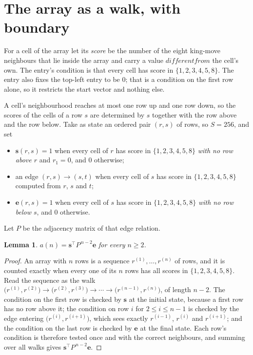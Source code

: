 \documentclass[11pt,a4paper]{article}
\theoremstyle{plain}
\newtheorem{lemma}[theorem]{Lemma}
\theoremstyle{definition}
\begin{document}
\section{The array as a walk, with boundary}

For a cell of the array let its \emph{score} be the number of the eight king-move neighbours that lie inside
the array and carry a value $different from$ the cell's own. The entry's condition is that every cell
has score in $\{1,2,3,4,5,8\}$. The entry also fixes the top-left entry to be $0$; that is a condition on the first row alone, so it restricts the start vector and nothing else.

A cell's neighbourhood reaches at most one row up and one row down, so the scores of the
cells of a row $s$ are determined by $s$ together with the row above and the row below.
Take as state an ordered pair $(r,s)$ of rows, so $S=256$, and set
\begin{itemize}
\item $\mathbf{s}(r,s)=1$ when every cell of $r$ has score in $\{1,2,3,4,5,8\}$ \emph{with no row
above $r$} and $r_1=0$, and $0$ otherwise;
\item an edge $(r,s)\to(s,t)$ when every cell of $s$ has score in $\{1,2,3,4,5,8\}$ computed from
$r$, $s$ and $t$;
\item $\mathbf{e}(r,s)=1$ when every cell of $s$ has score in $\{1,2,3,4,5,8\}$ \emph{with no row
below $s$}, and $0$ otherwise.
\end{itemize}
Let $P$ be the adjacency matrix of that edge relation.

\begin{lemma}\label{lem:walk}
$a(n)=\mathbf{s}^{\!\top}P^{\,n-2}\mathbf{e}$ for every $n\ge2$.
\end{lemma}

\begin{proof}
An array with $n$ rows is a sequence $r^{(1)},\dots,r^{(n)}$ of rows, and it is counted
exactly when every one of its $n$ rows has all scores in $\{1,2,3,4,5,8\}$. Read the sequence as the
walk $\bigl(r^{(1)},r^{(2)}\bigr)\to\bigl(r^{(2)},r^{(3)}\bigr)\to\cdots\to
\bigl(r^{(n-1)},r^{(n)}\bigr)$, of length $n-2$. The condition on the first row is
checked by $\mathbf{s}$ at the initial state, because a first row has no row above it; the
condition on row $i$ for $2\le i\le n-1$ is checked by the edge entering
$\bigl(r^{(i)},r^{(i+1)}\bigr)$, which sees exactly $r^{(i-1)}$, $r^{(i)}$ and
$r^{(i+1)}$; and the condition on the last row is checked by $\mathbf{e}$ at the final
state. Each row's condition is therefore tested once and with the correct neighbours, and
summing over all walks gives $\mathbf{s}^{\!\top}P^{\,n-2}\mathbf{e}$.
\end{proof}
\end{document}
